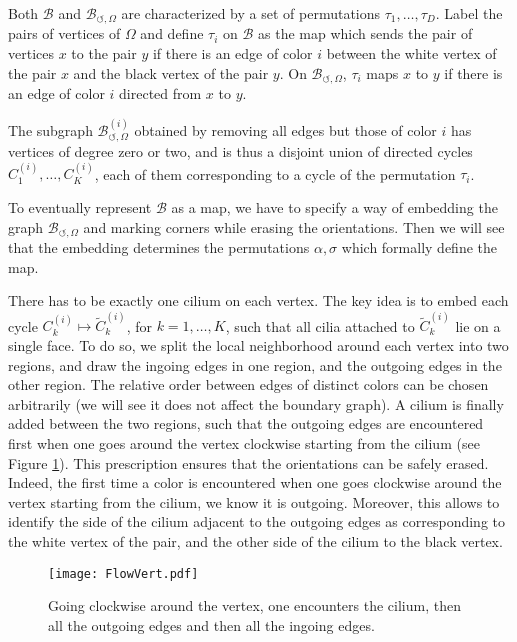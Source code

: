 \documentclass[aps,prd,10pt,notitlepage,nofootinbib,superscriptaddress,showkeys,showpacs]{revtex4-1}
\begin{document}
Both ${\mathcal{B}}$ and ${\mathcal{B}}_{\circlearrowleft, \Omega}$ are characterized by a set of permutations $\tau_1, \dotsc, \tau_D$. Label the pairs of vertices of $\Omega$ and define $\tau_i$ on ${\mathcal{B}}$ as the map which sends the pair of vertices $x$ to the pair $y$ if there is an edge of color $i$ between the white vertex of the pair $x$ and the black vertex of the pair $y$. On ${\mathcal{B}}_{\circlearrowleft, \Omega}$, $\tau_i$ maps $x$ to $y$ if there is an edge of color $i$ directed from $x$ to $y$.

The subgraph ${\mathcal{B}}_{\circlearrowleft, \Omega}^{(i)}$ obtained by removing all edges but those of color $i$ has vertices of degree zero or two, and is thus a disjoint union of directed cycles $C_1^{(i)}, \dotsc, C_K^{(i)}$, each of them corresponding to a cycle of the permutation $\tau_i$.

To eventually represent ${\mathcal{B}}$ as a map, we have to specify a way of embedding the graph ${\mathcal{B}}_{\circlearrowleft, \Omega}$ and marking corners while erasing the orientations. Then we will see that the embedding determines the permutations $\alpha, \sigma$ which formally define the map. 

There has to be exactly one cilium on each vertex. The key idea is to embed each cycle $C_k^{(i)} \mapsto \tilde{C}_k^{(i)}$, for $k=1, \dotsc, K$, such that all cilia attached to $\tilde{C}_k^{(i)}$ lie on a single face. To do so, we split the local neighborhood around each vertex into two regions, and draw the ingoing edges in one region, and the outgoing edges in the other region. The relative order between edges of distinct colors can be chosen arbitrarily (we will see it does not affect the boundary graph). A cilium is finally added between the two regions, such that the outgoing edges are encountered first when one goes around the vertex clockwise starting from the cilium (see Figure \ref{fig:FlowVert}). This prescription ensures that the orientations can be safely erased. Indeed, the first time a color is encountered when one goes clockwise around the vertex starting from the cilium, we know it is outgoing. Moreover, this allows to identify the side of the cilium adjacent to the outgoing edges as corresponding to the white vertex of the pair, and the other side of the cilium to the black vertex.

\begin{figure}
\texttt{[image: FlowVert.pdf]}
\caption{\label{fig:FlowVert} Going clockwise around the vertex, one encounters the cilium, then all the outgoing edges and then all the ingoing edges.  }
\end{figure}
\end{document}
